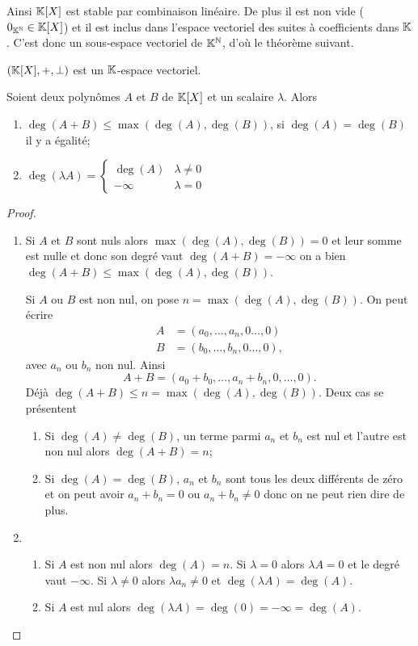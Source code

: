 Ainsi $\mathbb{K}[X]$ est stable par combinaison linéaire. De plus il est non vide ($0_{\mathbb{K}^{\mathbb{N}}} \in \mathbb{K}[X]$) et il est inclus dans l'espace vectoriel des suites à coefficients dans $\mathbb{K}$. C'est donc un sous-espace vectoriel de $\mathbb{K}^{\mathbb{N}}$, d'où le théorème suivant.

\begin{theo}
  $(\mathbb{K}[X], +, \perp)$ est un $\mathbb{K}$-espace vectoriel.
\end{theo}

\begin{prop}
  Soient deux polynômes $A$ et $B$ de $\mathbb{K}[X]$ et un scalaire $\lambda$. Alors
  \begin{enumerate}
  \item $\deg(A+B) \leqslant \max(\deg(A),\deg(B))$, si $\deg(A)=\deg(B)$ il y a égalité;
  \item $\deg(\lambda A) = \begin{cases} \deg(A) & \lambda \neq 0 \\ -\infty & \lambda =0 \end{cases}$
  \end{enumerate}
\end{prop}
\begin{proof}
  \begin{enumerate}
  \item Si $A$ et $B$ sont nuls alors $\max(\deg(A),\deg(B))=0$ et leur somme est nulle et donc son degré vaut $\deg(A+B)=-\infty$ on a bien $\deg(A+B) \leqslant \max(\deg(A),\deg(B))$. 

    Si $A$ ou $B$ est non nul, on pose $n=\max(\deg(A),\deg(B))$. On peut écrire
    \begin{align}
      A &= (a_0, \ldots, a_n, 0 \ldots, 0) \\
      B &= (b_0, \ldots, b_n, 0 \ldots, 0),
    \end{align}
    avec $a_n$ ou $b_n$ non nul. Ainsi
    \begin{equation}
      A+B = (a_0+b_0, \ldots, a_n+b_n, 0, \ldots, 0).
    \end{equation}
    Déjà $\deg(A+B) \leqslant n = \max(\deg(A),\deg(B))$. Deux cas se présentent
    \begin{enumerate}
    \item Si $\deg(A) \neq \deg(B)$, un terme parmi $a_n$ et $b_n$ est nul et l'autre est non nul alors $\deg(A+B)=n$;
    \item Si $\deg(A) = \deg(B)$, $a_n$ et $b_n$ sont tous les deux différents de zéro et on peut avoir $a_n+b_n=0$ ou $a_n+b_n \neq 0$ donc on ne peut rien dire de plus.
    \end{enumerate}
  \item
    \begin{enumerate}
    \item Si $A$ est non nul alors $\deg(A)=n$. Si $\lambda=0$ alors $\lambda A=0$ et le degré vaut $-\infty$. Si $\lambda \neq 0$ alors $\lambda a_n \neq 0$ et $\deg(\lambda A)=\deg(A)$.
    \item Si $A$ est nul alors $\deg(\lambda A)=\deg(0)=-\infty=\deg(A)$.
    \end{enumerate}
  \end{enumerate}
\end{proof}

